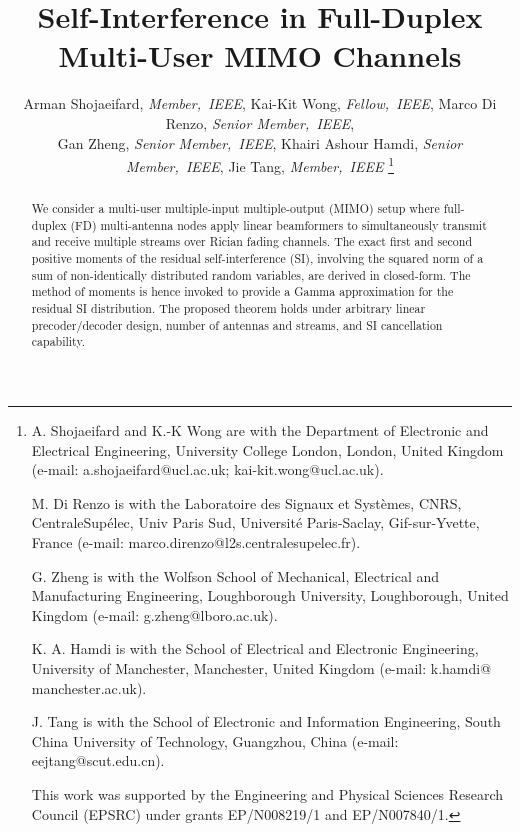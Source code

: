 \documentclass[onecolumn]{IEEEtran}
\begin{document}
\title{{\huge Self-Interference in Full-Duplex Multi-User MIMO Channels}} 

\author{Arman Shojaeifard, \textit{Member,~IEEE}, Kai-Kit Wong, \textit{Fellow,~IEEE}, Marco Di Renzo, \textit{Senior Member,~IEEE},\\ Gan Zheng, \textit{Senior Member,~IEEE}, Khairi Ashour Hamdi, \textit{Senior Member,~IEEE}, Jie Tang, \textit{Member,~IEEE}
\thanks{A. Shojaeifard and K.-K Wong are with the Department of Electronic and Electrical Engineering, University College London, London, United Kingdom (e-mail: a.shojaeifard@ucl.ac.uk; kai-kit.wong@ucl.ac.uk).\par M. Di Renzo is with the Laboratoire des Signaux et Syst\`emes, CNRS, CentraleSup\'elec, Univ Paris Sud, Universit\'e Paris-Saclay, Gif-sur-Yvette, France (e-mail: marco.direnzo@l2s.centralesupelec.fr).\par G. Zheng is with the Wolfson School of Mechanical, Electrical and Manufacturing Engineering, Loughborough University, Loughborough, United Kingdom (e-mail: g.zheng@lboro.ac.uk).\par K. A. Hamdi is with the School of Electrical and Electronic Engineering, University of Manchester, Manchester, United Kingdom (e-mail: k.hamdi@ manchester.ac.uk).\par J. Tang is with the School of Electronic and Information Engineering, South China University of Technology, Guangzhou, China (e-mail: eejtang@scut.edu.cn).\par This work was supported by the Engineering and Physical Sciences Research Council (EPSRC) under grants EP/N008219/1 and EP/N007840/1.}}
\maketitle

\begin{abstract}
 
We consider a multi-user multiple-input multiple-output (MIMO) setup where full-duplex (FD) multi-antenna nodes apply linear beamformers to simultaneously transmit and receive multiple streams over Rician fading channels. The exact first and second positive moments of the residual self-interference (SI), involving the squared norm of a sum of non-identically distributed random variables, are derived in closed-form. The method of moments is hence invoked to provide a Gamma approximation for the residual SI distribution. The proposed theorem holds under arbitrary linear precoder/decoder design, number of antennas and streams, and SI cancellation capability. 

\end{abstract}
\end{document}
